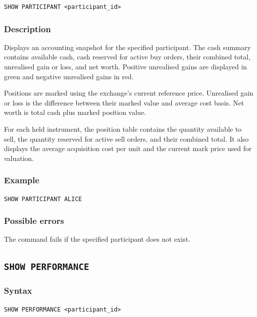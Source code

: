 \documentclass{article}
\begin{document}
\begin{lstlisting}
SHOW PARTICIPANT <participant_id>
\end{lstlisting}

\subsubsection*{Description}

Displays an accounting snapshot for the specified participant. The cash
summary contains available cash, cash reserved for active buy orders, their
combined total, unrealised gain or loss, and net worth. Positive unrealised
gains are displayed in green and negative unrealised gains in red.

Positions are marked using the exchange's current reference price. Unrealised
gain or loss is the difference between their marked value and average cost
basis. Net worth is total cash plus marked position value.

For each held instrument, the position table contains the quantity available
to sell, the quantity reserved for active sell orders, and their combined
total. It also displays the average acquisition cost per unit and the current
mark price used for valuation.

\subsubsection*{Example}

\begin{lstlisting}
SHOW PARTICIPANT ALICE
\end{lstlisting}

\subsubsection*{Possible errors}

The command fails if the specified participant does not exist.

\subsection{\texttt{SHOW PERFORMANCE}}

\subsubsection*{Syntax}

\begin{lstlisting}
SHOW PERFORMANCE <participant_id>
\end{lstlisting}
\end{document}
